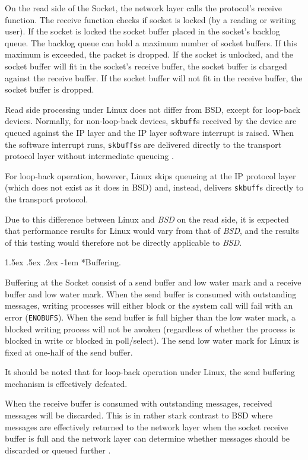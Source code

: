 \documentclass[letterpaper,final,notitlepage,twocolumn,10pt,twoside]{article}
\makeatletter
\renewcommand\paragraph{\@startsection{paragraph}{4}{\z@}%
                                    {1.5ex \@plus .5ex \@minus .2ex}%
                                    {-1em}%
                                    {\normalfont\normalsize\bfseries\slshape}}
\makeatother
\begin{document}
On the read side of the Socket, the network layer calls the protocol's receive function.  The
receive function checks if socket is locked (by a reading or writing user).  If the socket is locked
the socket buffer placed in the socket's backlog queue.  The backlog queue can hold a maximum number
of socket buffers.  If this maximum is exceeded, the packet is dropped.  If the socket is unlocked,
and the socket buffer will fit in the socket's receive buffer, the socket buffer is charged against
the receive buffer.  If the socket buffer will not fit in the receive buffer, the socket buffer is
dropped.

Read side processing under Linux does not differ from BSD, except for loop-back devices.  Normally,
for non-loop-back devices, \texttt{skbuff}s received by the device are queued against the IP layer
and the IP layer software interrupt is raised.  When the software interrupt runs, \texttt{skbuffs}s
are delivered directly to the transport protocol layer without intermediate queueing \cite[]{bsd}.

For loop-back operation, however, Linux skips queueing at the IP protocol layer (which does not
exist as it does in BSD) and, instead, delivers \texttt{skbuff}s directly to the transport protocol.

Due to this difference between Linux and \textsl{BSD} on the read side, it is expected that
performance results for Linux would vary from that of \textsl{BSD}, and the results of this testing
would therefore not be directly applicable to \textsl{BSD}.

\paragraph*{Buffering.}

Buffering at the Socket consist of a send buffer and low water mark and a receive buffer and low
water mark.  When the send buffer is consumed with outstanding messages, writing processes will
either block or the system call will fail with an error (\texttt{ENOBUFS}).   When the send buffer
is full higher than the low water mark, a blocked writing process will not be awoken (regardless of
whether the process is blocked in write or blocked in poll/select).  The send low water mark for
Linux is fixed at one-half of the send buffer.

It should be noted that for loop-back operation under Linux, the send buffering mechanism is
effectively defeated.

When the receive buffer is consumed with outstanding messages, received messages will be discarded.
This is in rather stark contrast to BSD where messages are effectively returned to the network layer
when the socket receive buffer is full and the network layer can determine whether messages should
be discarded or queued further \cite[]{bsd}.
\end{document}

